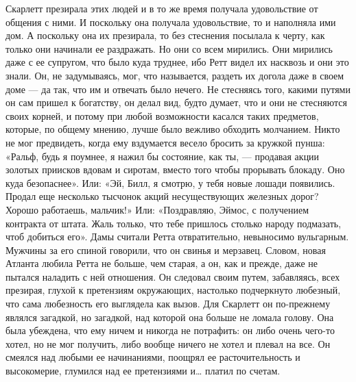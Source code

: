 Скарлетт презирала этих людей и в то же время получала удовольствие от общения с ними. И поскольку она получала удовольствие, то и наполняла ими дом. А поскольку она их презирала, то без стеснения посылала к черту, как только они начинали ее раздражать. Но они со всем мирились.
Они мирились даже с ее супругом, что было куда труднее, ибо Ретт видел их насквозь и они это знали. Он, не задумываясь, мог, что называется, раздеть их догола даже в своем доме — да так, что им и отвечать было нечего. Не стесняясь того, какими путями он сам пришел к богатству, он делал вид, будто думает, что и они не стесняются своих корней, и потому при любой возможности касался таких предметов, которые, по общему мнению, лучше было вежливо обходить молчанием.
Никто не мог предвидеть, когда ему вздумается весело бросить за кружкой пунша: «Ральф, будь я поумнее, я нажил бы состояние, как ты, — продавая акции золотых приисков вдовам и сиротам, вместо того чтобы прорывать блокаду. Оно куда безопаснее».
Или: «Эй, Билл, я смотрю, у тебя новые лошади появились. Продал еще несколько тысчонок акций несуществующих железных дорог? Хорошо работаешь, мальчик!» Или: «Поздравляю, Эймос, с получением контракта от штата. Жаль только, что тебе пришлось столько народу подмазать, чтоб добиться его».
Дамы считали Ретта отвратительно, невыносимо вульгарным. Мужчины за его спиной говорили, что он свинья и мерзавец. Словом, новая Атланта любила Ретта не больше, чем старая, а он, как и прежде, даже не пытался наладить с ней отношения. Он следовал своим путем, забавляясь, всех презирая, глухой к претензиям окружающих, настолько подчеркнуто любезный, что сама любезность его выглядела как вызов. Для Скарлетт он по-прежнему являлся загадкой, но загадкой, над которой она больше не ломала голову. Она была убеждена, что ему ничем и никогда не потрафить: он либо очень чего-то хотел, но не мог получить, либо вообще ничего не хотел и плевал на все. Он смеялся над любыми ее начинаниями, поощрял ее расточительность и высокомерие, глумился над ее претензиями и… платил по счетам.

